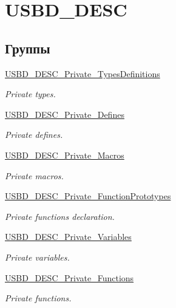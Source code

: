 \hypertarget{group___u_s_b_d___d_e_s_c}{
\section{USBD\_\-DESC}
\label{group___u_s_b_d___d_e_s_c}
}
\subsection*{Группы}
\begin{CompactItemize}
\item 
\hyperlink{group___u_s_b_d___d_e_s_c___private___types_definitions}{USBD\_\-DESC\_\-Private\_\-TypesDefinitions}
\begin{CompactList}\small\item\em Private types. \item\end{CompactList}

\item 
\hyperlink{group___u_s_b_d___d_e_s_c___private___defines}{USBD\_\-DESC\_\-Private\_\-Defines}
\begin{CompactList}\small\item\em Private defines. \item\end{CompactList}

\item 
\hyperlink{group___u_s_b_d___d_e_s_c___private___macros}{USBD\_\-DESC\_\-Private\_\-Macros}
\begin{CompactList}\small\item\em Private macros. \item\end{CompactList}

\item 
\hyperlink{group___u_s_b_d___d_e_s_c___private___function_prototypes}{USBD\_\-DESC\_\-Private\_\-FunctionPrototypes}
\begin{CompactList}\small\item\em Private functions declaration. \item\end{CompactList}

\item 
\hyperlink{group___u_s_b_d___d_e_s_c___private___variables}{USBD\_\-DESC\_\-Private\_\-Variables}
\begin{CompactList}\small\item\em Private variables. \item\end{CompactList}

\item 
\hyperlink{group___u_s_b_d___d_e_s_c___private___functions}{USBD\_\-DESC\_\-Private\_\-Functions}
\begin{CompactList}\small\item\em Private functions. \item\end{CompactList}

\end{CompactItemize}
